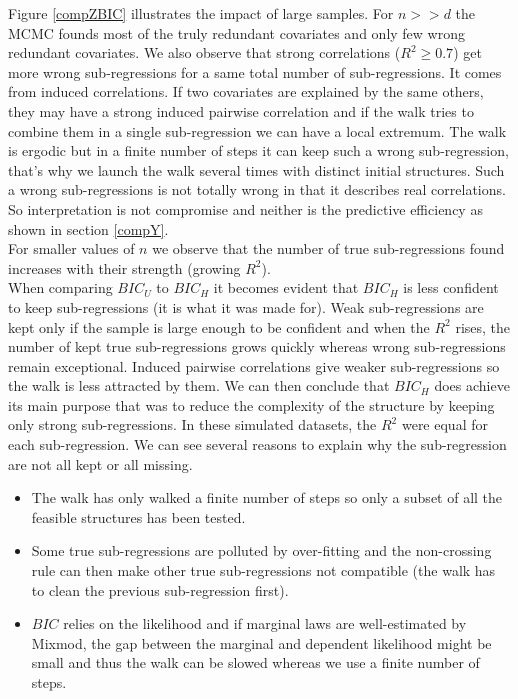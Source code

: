 \documentclass[12pt,a4paper]{report}
\begin{document}
Figure \ref{compZBIC} illustrates the impact of large samples. For $n>>d$ the MCMC founds most of the truly redundant covariates and only few wrong redundant covariates. We also observe that strong correlations ($R^2\geq 0.7$) get more wrong sub-regressions for a same total number of sub-regressions. It comes from induced correlations. If two covariates are explained by the same others, they may have a strong induced pairwise correlation and if the walk tries to combine them in a single sub-regression we can have a local extremum. The walk is ergodic but in a finite number of steps it can keep such a wrong sub-regression, that's why we launch the walk several times with distinct initial structures. Such a wrong sub-regressions is not totally wrong in that it describes real correlations. So interpretation is not compromise and neither is the predictive efficiency as shown in section \ref{compY}. \\
For smaller values of $n$ we observe that the number of true sub-regressions found increases with their strength (growing $R^2$).\\
When comparing $BIC_U$ to $BIC_H$ it becomes evident that $BIC_H$ is less confident to keep sub-regressions (it is what it was made for). Weak sub-regressions are kept only if the sample is large enough to be confident and when the $R^2$ rises, the number of kept true sub-regressions grows quickly whereas wrong sub-regressions remain exceptional. Induced pairwise correlations give weaker sub-regressions so the walk is less attracted by them. We can then conclude that $BIC_H$ does achieve its main purpose that was to reduce the complexity of the structure by keeping only strong sub-regressions. In these simulated datasets, the $R^2$ were equal for each sub-regression. We can see several reasons to explain why the sub-regression are not all kept or all missing. 
\begin{itemize}
	\item The walk has only walked a finite number of steps so only a subset of all the feasible structures has been tested.
	\item Some true sub-regressions are polluted by over-fitting and the non-crossing rule can then make other true sub-regressions not compatible (the walk has to clean the previous sub-regression first).
	\item $BIC$ relies on the likelihood and if marginal laws are well-estimated by Mixmod, the gap between the marginal and dependent likelihood might be small and thus the walk can be slowed whereas we use a finite number of steps.
\end{itemize}
\end{document}
